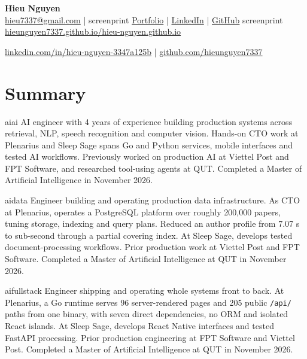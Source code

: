 \documentclass[11pt, a4paper]{article}
\def\variant{ai}
\newcommand{\AI}[1]{\ifx\variant\VAI#1\fi}
\newcommand{\DATA}[1]{\ifx\variant\VDATA#1\fi}
\newcommand{\FULL}[1]{\ifx\variant\VFULL#1\fi}
\def\VAI{ai}
\def\VDATA{data}
\def\VFULL{fullstack}
\def\medium{screen}
\def\MPRINT{print}
\newcommand{\SCREEN}[1]{\ifx\medium\MPRINT\else#1\fi}
\newcommand{\PRINT}[1]{\ifx\medium\MPRINT#1\fi}
\begin{document}
\begin{center}
  {\LARGE\bfseries Hieu Nguyen}\\[5pt]
  \href{mailto:hieu7337@gmail.com}{hieu7337@gmail.com}
  \enspace|\enspace
  \SCREEN{%
  \href{https://hieunguyen7337.github.io/hieu-nguyen.github.io/}{Portfolio}
  \enspace|\enspace
  \href{https://www.linkedin.com/in/hieu-nguyen-3347a125b}{LinkedIn}
  \enspace|\enspace
  \href{https://github.com/hieunguyen7337}{GitHub}%
  }%
  \PRINT{%
  \href{https://hieunguyen7337.github.io/hieu-nguyen.github.io/}{hieunguyen7337.github.io/hieu-nguyen.github.io}\par\vspace{2pt}
  \href{https://www.linkedin.com/in/hieu-nguyen-3347a125b}{linkedin.com/in/hieu-nguyen-3347a125b}
  \enspace|\enspace
  \href{https://github.com/hieunguyen7337}{github.com/hieunguyen7337}%
  }
\end{center}

\section{Summary}

\AI{
AI engineer with 4 years of experience building production systems across retrieval, NLP, speech recognition and computer vision. Hands-on CTO work at Plenarius and Sleep Sage spans Go and Python services, mobile interfaces and tested AI workflows. Previously worked on production AI at Viettel Post and FPT Software, and researched tool-using agents at QUT. Completed a Master of Artificial Intelligence in November 2026.
}

\DATA{
Engineer building and operating production data infrastructure. As CTO at Plenarius, operates a PostgreSQL platform over roughly 200,000 papers, tuning storage, indexing and query plans. Reduced an author profile from 7.07 s to sub-second through a partial covering index. At Sleep Sage, develops tested document-processing workflows. Prior production work at Viettel Post and FPT Software. Completed a Master of Artificial Intelligence at QUT in November 2026.
}

\FULL{
Engineer shipping and operating whole systems front to back. At Plenarius, a Go runtime serves 96 server-rendered pages and 205 public \texttt{/api/} paths from one binary, with seven direct dependencies, no ORM and isolated React islands. At Sleep Sage, develops React Native interfaces and tested FastAPI processing. Prior production engineering at FPT Software and Viettel Post. Completed a Master of Artificial Intelligence at QUT in November 2026.
}
\end{document}
